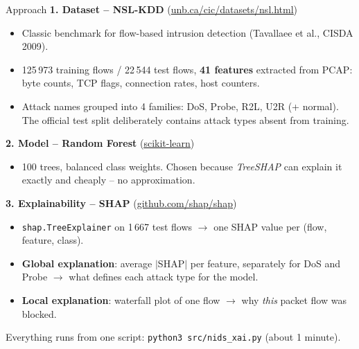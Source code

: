 \documentclass[11pt,aspectratio=169]{beamer}
\newcommand{\f}[1]{{\small\texttt{#1}}}
\newcommand{\link}[2]{\href{#1}{\color{accent}\underline{#2}}}
\begin{document}
\begin{frame}{Approach}
\footnotesize
\textbf{1. Dataset -- NSL-KDD} (\link{https://www.unb.ca/cic/datasets/nsl.html}{unb.ca/cic/datasets/nsl.html})
\begin{itemize}\itemsep1pt
  \item Classic benchmark for flow-based intrusion detection (Tavallaee et al., CISDA 2009).
  \item 125\,973 training flows / 22\,544 test flows, \textbf{41 features} extracted
        from PCAP: byte counts, TCP flags, connection rates, host counters.
  \item Attack names grouped into 4 families: DoS, Probe, R2L, U2R (+ normal).
        The official test split deliberately contains attack types absent from training.
\end{itemize}

\vspace{0.5em}
\textbf{2. Model -- Random Forest} (\link{https://scikit-learn.org/}{scikit-learn})
\begin{itemize}\itemsep1pt
  \item 100 trees, balanced class weights. Chosen because \emph{TreeSHAP} can
        explain it exactly and cheaply -- no approximation.
\end{itemize}

\vspace{0.5em}
\textbf{3. Explainability -- SHAP} (\link{https://github.com/shap/shap}{github.com/shap/shap})
\begin{itemize}\itemsep1pt
  \item \f{shap.TreeExplainer} on 1\,667 test flows $\rightarrow$ one SHAP value
        per (flow, feature, class).
  \item \textbf{Global explanation}: average $|$SHAP$|$ per feature, separately for
        DoS and Probe $\rightarrow$ what defines each attack type for the model.
  \item \textbf{Local explanation}: waterfall plot of one flow $\rightarrow$ why
        \emph{this} packet flow was blocked.
\end{itemize}

\vspace{0.5em}
Everything runs from one script: \f{python3 src/nids\_xai.py} (about 1 minute).
\end{frame}
\end{document}
